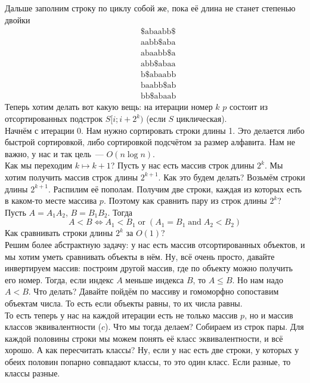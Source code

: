 \documentclass{article}
\begin{document}
    Дальше заполним строку по циклу собой же, пока её длина не станет степенью двойки
    \begin{align*}
        &\$\mathrm{abaabb}\$\\
        &\mathrm{aabb}\$\mathrm{aba}\\
        &\mathrm{abaabb}\$\mathrm{a}\\
        &\mathrm{abb}\$\mathrm{abaa}\\
        &\mathrm{b}\$\mathrm{abaabb}\\
        &\mathrm{baabb}\$\mathrm{ab}\\
        &\mathrm{bb}\$\mathrm{abaab}
    \end{align*}
    Теперь хотим делать вот какую вещь: на итерации номер $k$ $p$ состоит из отсортированных подстрок $S[i;i+2^k)$ (если $S$ циклическая).\\
    Начнём с итерации 0. Нам нужно сортировать строки длины 1. Это делается либо быстрой сортировкой, либо сортировкой подсчётом за размер алфавита. Нам не важно, у нас и так цель~--- $O(n\log n)$.\\
    Как мы переходим $k\mapsto k+1$? Пусть у нас есть массив строк длины $2^k$. Мы хотим получить массив строк длины $2^{k+1}$. Как это будем делать? Возьмём строки длины $2^{k+1}$. Распилим её пополам. Получим две строки, каждая из которых есть в каком-то месте массива $p$. Поэтому как сравнить пару из строк длины $2^k$? Пусть $A=A_1A_2$, $B=B_1B_2$. Тогда
    $$
    A<B\Leftrightarrow A_1<B_1\operatorname{or}(A_1=B_1\operatorname{and}A_2<B_2)
    $$
    Как сравнивать строки длины $2^k$ за $O(1)$?\\
    Решим более абстрактную задачу: у нас есть массив отсортированных объектов, и мы хотим уметь сравнивать объекты в нём. Ну, всё очень просто, давайте инвертируем массив: построим другой массив, где по объекту можно получить его номер. Тогда, если индекс $A$ меньше индекса $B$, то $A\leqslant B$. Но нам надо $A<B$. Что делать? Давайте пойдём по массиву и гомоморфно сопоставим объектам числа. То есть если объекты равны, то их числа равны.\\
    То есть теперь у нас на каждой итерации есть не только массив $p$, но и массив классов эквивалентности ($c$). Что мы тогда делаем? Собираем из строк пары. Для каждой половины строки мы можем понять её класс эквивалентности, и всё хорошо. А как пересчитать классы? Ну, если у нас есть две строки, у которых у обеих половин попарно совпадают классы, то это один класс. Если разные, то классы разные.\\
\end{document}
